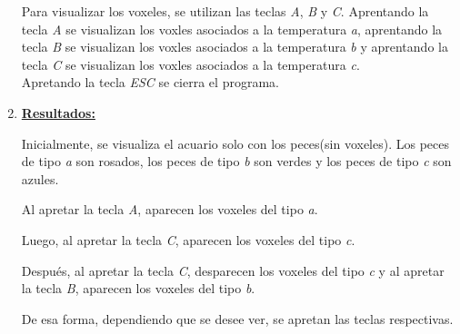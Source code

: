 \documentclass[letterpaper,11pt,oneside]{article}
\begin{document}
\begin{enumerate}
        Para visualizar los voxeles, se utilizan las teclas \textit{A}, \textit{B} y \textit{C}. Aprentando la tecla \textit{A} se visualizan los voxles asociados a la temperatura \textit{a}, aprentando la tecla \textit{B} se visualizan los voxles asociados a la temperatura \textit{b} y aprentando la tecla \textit{C} se visualizan los voxles asociados a la temperatura \textit{c}.\\

        Apretando la tecla \textit{ESC} se cierra el programa.

    \item \textbf{\underline{Resultados:}} 

        Inicialmente, se visualiza el acuario solo con los peces(sin voxeles). Los peces de tipo \textit{a} son rosados, los peces de tipo \textit{b} son verdes y los peces de tipo \textit{c} son azules.


        Al apretar la tecla \textit{A}, aparecen los voxeles del tipo \textit{a}.

        Luego, al apretar la tecla \textit{C}, aparecen los voxeles del tipo \textit{c}.

        Después, al apretar la tecla \textit{C}, desparecen los voxeles del tipo \textit{c} y al apretar la tecla \textit{B}, aparecen los voxeles del tipo \textit{b}.


        De esa forma, dependiendo que se desee ver, se apretan las teclas respectivas.

\end{enumerate}

\end{document}
